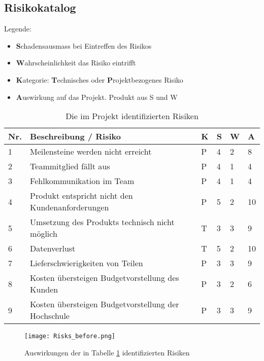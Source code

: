 \newpage

\subsection{Risikokatalog}
\label{sssec:Risikokatalog}
Legende:
\begin{itemize}
	\item \textbf{S}chadensausmass bei Eintreffen des Risikos
	\item \textbf{W}ahrscheinlichkeit das Risiko eintrifft
	\item \textbf{K}ategorie: \textbf{T}echnisches oder \textbf{P}rojektbezogenes Risiko
	\item \textbf{A}uswirkung auf das Projekt. Produkt aus S und W
\end{itemize}

\vspace{1em}
\noindent
\begin{table}[htb]
	\begin{tabularx}{\textwidth}{|l|X|l|l|l||l|}
		\hline
		\textbf{Nr.} & \textbf{Beschreibung / Risiko} & \textbf{K} & \textbf{S} & \textbf{W} & \textbf{A} \\
		\hline
		1 & Meilensteine werden nicht erreicht & P & 4 & 2 & 8 \\
		\hline
		2 & Teammitglied fällt aus & P & 4 & 1 & 4 \\
		\hline
		3 & Fehlkommunikation im Team & P & 4 & 1 & 4 \\
		\hline
		4 & Produkt entspricht nicht den Kundenanforderungen & P & 5 & 2 & 10 \\
		\hline
		5 & Umsetzung des Produkts technisch nicht möglich & T & 3 & 3 & 9 \\
		\hline
		6 & Datenverlust & T & 5 & 2 & 10 \\
		\hline
		7 & Lieferschwierigkeiten von Teilen & P & 3 & 3 & 9 \\
		\hline
		8 & Kosten übersteigen Budgetvorstellung des Kunden & P & 3 & 2 & 6\\
		\hline
		9 & Kosten übersteigen Budgetvorstellung der Hochschule & P & 3 & 3 & 9\\
		\hline
	\end{tabularx}
	\caption{Die im Projekt identifizierten Risiken}
	\label{tbl:Risks}
\end{table}

\vspace{1em}

\begin{figure}[h!]
	\centering
	\texttt{[image: Risks\_before.png]}
	\caption{Auswirkungen der in Tabelle \ref{tbl:Risks} identifizierten Risiken}
\end{figure}

